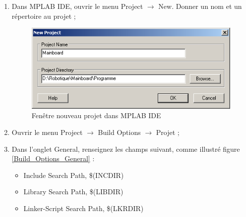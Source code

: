 \documentclass[a4paper]{article}
\begin{document}
\begin{enumerate}
	\item Dans MPLAB \ac{IDE}, ouvrir le menu \og{}Project\fg{} $\rightarrow$ \og{}New\fg{}. Donner un nom et un répertoire au projet ;
		\begin{figure}[H]
			\centering
			\includegraphics[scale=0.75]{Images/Fenetre_nouveau_projet.png}
			\caption{Fenêtre \og{}nouveau projet\fg{} dans MPLAB \ac{IDE}
				\label{Fenetre_nouveau_projet}}
		\end{figure}
	\item Ouvrir le menu \og{}Project\fg{} $\rightarrow$ \og{}Build Options\fg{} $\rightarrow$ \og{}Projet\fg{} ;
	\item Dans l'onglet \og{}General\fg{}, renseignez les champs suivant, comme illustré figure \ref{Build_Options_General} :
		\begin{itemize}
			\item Include Search Path, \$(INCDIR)
			\item Library Search Path, \$(LIBDIR)
			\item Linker-Script Search Path, \$(LKRDIR)
		\end{itemize}


\end{enumerate}
\end{document}
